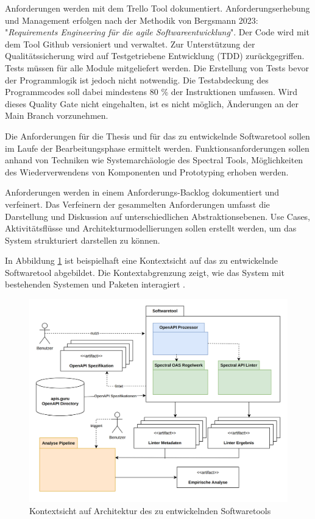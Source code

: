 Anforderungen werden mit dem Trello Tool dokumentiert. Anforderungserhebung und Management erfolgen nach der Methodik von Bergsmann 2023: "\textit{Requirements Engineering für die agile Softwareentwicklung}"\parencite{bergsmann_requirements_2023}. Der Code wird mit dem Tool Github versioniert und verwaltet. Zur Unterstützung der Qualitätssicherung wird auf Testgetriebene Entwicklung (TDD) zurückgegriffen. Tests müssen für alle Module mitgeliefert werden. Die Erstellung von Tests bevor der Programmlogik ist jedoch nicht notwendig. Die Testabdeckung des Programmcodes soll dabei mindestens 80 \% der Instruktionen umfassen. Wird dieses Quality Gate nicht eingehalten, ist es nicht möglich, Änderungen an der Main Branch vorzunehmen.

Die Anforderungen für die Thesis und für das zu entwickelnde Softwaretool sollen im Laufe der Bearbeitungsphase ermittelt werden. Funktionsanforderungen sollen anhand von Techniken wie  Systemarchäologie des Spectral Tools, Möglichkeiten des Wiederverwendens von Komponenten und Prototyping erhoben werden.

Anforderungen werden in einem Anforderungs-Backlog dokumentiert und verfeinert. Das Verfeinern der gesammelten Anforderungen umfasst die Darstellung und Diskussion auf unterschiedlichen Abstraktionsebenen. Use Cases, Aktivitätsflüsse \parencite{rupp_uml_2012} und Architekturmodellierungen sollen erstellt werden, um das System strukturiert darstellen zu können. 

In Abbildung \ref{fig:Kontextsicht} ist beispielhaft eine Kontextsicht auf das zu entwickelnde Softwaretool abgebildet. Die Kontextabgrenzung zeigt, wie das System mit bestehenden Systemen und Paketen interagiert \parencite{starke_effektive_2024}.

\newpage
\begin{figure}[htbp]
    \centering
    \includegraphics[width=1\linewidth]{img/contextview.png}
    \caption{Kontextsicht auf Architektur des zu entwickelnden Softwaretools}
    \label{fig:Kontextsicht}
\end{figure}

